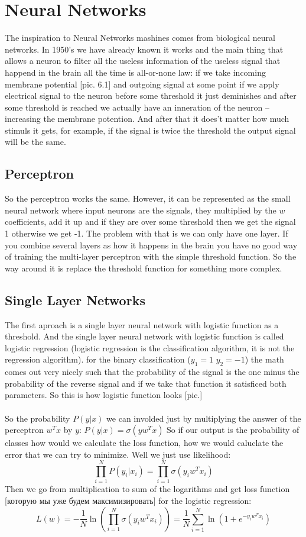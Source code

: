 \chapter{Neural Networks}

{\sf The inspiration to Neural Networks mashines comes from biological neural networks. In 1950's we have already known it works and the main thing that allows a neuron to filter all the useless information of the useless signal that happend in the brain all the time is all-or-none law: if we take incoming membrane potential [pic. 6.1] and outgoing signal at some point if we apply electrical signal to the neuron before some threshold it just deminishes and after some threshold is reached we actually have an inneration of the neuron -- increasing the membrane potention. And after that it does't matter how much stimuls it gets, for example, if the signal is twice the threshold the output signal will be the same.}

\section{Perceptron}

So the perceptron works the same. However, it can be represented as the small neural network where input neurons are the signals, they multiplied by the $w$ coefficients, add it up and if they are over some threshold then we get the signal 1 otherwise we get -1. The problem with that is we can only have one layer. If you combine several layers as how it happens in the brain you have no good way of training the multi-layer perceptron with the simple threshold function. So the way around it is replace the threshold function for something more complex.

\section{Single Layer Networks}

The first aproach is a single layer neural network with logistic function as a threshold. And the single layer neural network with logistic function is called logistic regression (logistic regression is the classification algorithm, it is not the regression algorithm). for the binary classification ($y_1=1$ $y_2=-1$) the math comes out very nicely such that the probability of the signal is the one minus the probability of the reverse signal and if we take that function it satisficed both parameters. So this is how logistic function looks [pic.]\\
{\it <Some formulas>}\\
So the probability $P(y|x)$ we can involded just by multiplying the answer of the perceptron $w^Tx$ by $y$:
$P(y|x)=\sigma(yw^Tx)$
So if our output is the probability of classes how would we calculate the loss function, how we would caluclate the error that we can try to minimize. Well we just use likelihood:
$$\prod\limits_{i=1}^{N}P(y_i|x_i)=\prod\limits_{i=1}^{N}\sigma(y_iw^Tx_i)$$
Then we go from multiplication to sum of the logarithms and get loss function [которую мы уже будем максимизировать] for the logistic regression:
$$L(w)=-\frac{1}{N}\ln\left(\prod\limits_{i=1}^N\sigma(y_iw^Tx_i)\right)=\frac{1}{N}\sum\limits_{i=1}^N\ln(1+e^{-y_iw^Tx_i})$$

